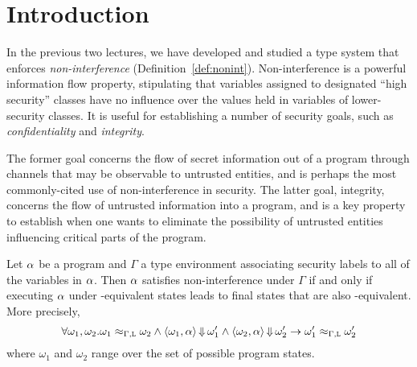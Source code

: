 \documentclass[11pt,twoside]{scrartcl}
\begin{document}
\newcommand{\atrace}{\omega}%
\newcommand{\stdI}{\dTLint[state=\omega]}%
\newcommand{\Ip}{\dTLint[trace=\atrace]}%
\newcommand{\ws}{\omega}\newcommand{\wt}{\nu}%

\maketitle
\thispagestyle{empty}


\section{Introduction}

In the previous two lectures, we have developed and studied a type system that enforces \emph{non-interference} (Definition~\ref{def:nonint}). Non-interference is a powerful information flow property, stipulating that variables assigned to designated ``high security'' classes have no influence over the values held in variables of lower-security classes. It is useful for establishing a number of security goals, such as \emph{confidentiality} and \emph{integrity}. 

The former goal concerns the flow of secret information out of a program through channels that may be observable to untrusted entities, and is perhaps the most commonly-cited use of non-interference in security. The latter goal, integrity, concerns the flow of untrusted information into a program, and is a key property to establish when one wants to eliminate the possibility of untrusted entities influencing critical parts of the program.

\begin{definition}
\label{def:nonint}
Let $\alpha$ be a program and $\Gamma$ a type environment associating security labels to all of the variables in $\alpha$. Then $\alpha$ satisfies non-interference under $\Gamma$ if and only if executing $\alpha$ under \lowsec-equivalent states leads to final states that are also \lowsec-equivalent. More precisely,
\begin{equation}
\label{eq:noninterference}
\forall \omega_1,\omega_2 . \omega_1 \approx_{\Gamma,\lowsec} \omega_2 \land 
\langle \omega_1, \asprg\rangle \bigstep \omega_1' \land 
\langle \omega_2, \asprg\rangle \bigstep \omega_2'
\limply
\omega_1' \approx_{\Gamma,\lowsec} \omega_2'
\end{equation}
where $\omega_1$ and $\omega_2$ range over the set of possible program states.
\end{definition}
\end{document}
